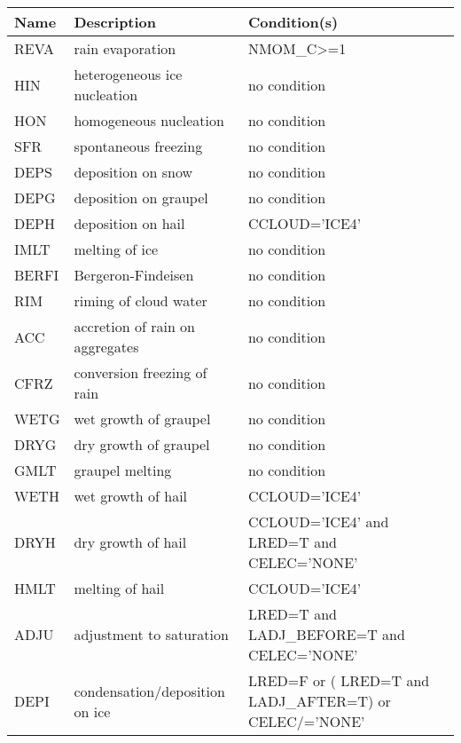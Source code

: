 \begin{longtable} {|p{}|p{}|p{}|}
\hline
Name & Description & Condition(s) \\
\hline \hline
\endhead
REVA   & rain evaporation                              & NMOM\_C>=1 \\\hline
HIN    & heterogeneous ice nucleation                  & no condition \\\hline
HON    & homogeneous nucleation                        & no condition \\\hline
SFR    & spontaneous freezing                          & no condition \\\hline
DEPS   & deposition on snow                            & no condition \\\hline
DEPG   & deposition on graupel                         & no condition \\\hline
DEPH   & deposition on hail                            & CCLOUD='ICE4' \\\hline
IMLT   & melting of ice                                & no condition \\\hline
BERFI  & Bergeron-Findeisen                            & no condition \\\hline
RIM    & riming of cloud water                         & no condition \\\hline
ACC    & accretion of rain on aggregates               & no condition \\\hline
CFRZ   & conversion freezing of rain                   & no condition \\\hline
WETG   & wet growth of graupel                         & no condition \\\hline
DRYG   & dry growth of graupel                         & no condition \\\hline
GMLT   & graupel melting                               & no condition \\\hline
WETH   & wet growth of hail                            & CCLOUD='ICE4' \\\hline
DRYH   & dry growth of hail                            & CCLOUD='ICE4' and LRED=T and CELEC='NONE' \\\hline
HMLT   & melting of hail                               & CCLOUD='ICE4' \\\hline
ADJU   & adjustment to saturation                      & LRED=T and LADJ\_BEFORE=T and CELEC='NONE' \\\hline
DEPI   & condensation/deposition on ice                & LRED=F or ( LRED=T and LADJ\_AFTER=T) or CELEC/='NONE' \\\hline

\end{longtable}
